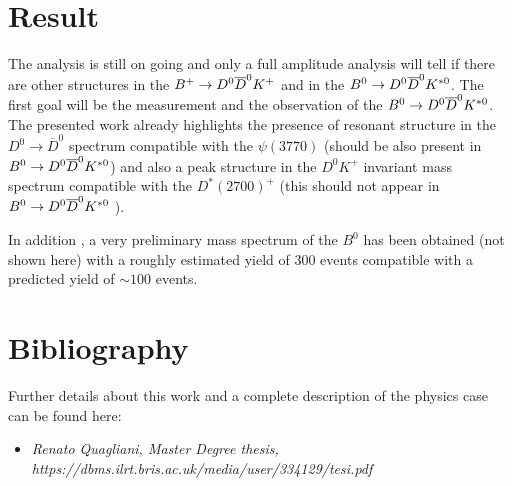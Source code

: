 \documentclass[11pt]{article}
\begin{document}
\section{Result}
The analysis is still on going and only a full amplitude analysis will tell if there are other structures in the $B^{+} \rightarrow D^0 \overline{D}^{0} K^{+}$ and in the $B^{0} \rightarrow D^0 \overline{D}^{0} K^{\ast 0}$. The first goal will be the measurement and the observation of the $B^{0} \rightarrow D^0 \overline{D}^{0} K^{\ast 0}$. The presented work already highlights the presence of resonant structure in the $D^{0} \rightarrow \overline{D} ^{0} $ spectrum compatible with the $\psi (3770)$ (should be also present in $B^{0} \rightarrow D^0 \overline{D}^{0} K^{\ast 0}$) and also a peak structure in the $D^{0} K^{+} $ invariant mass spectrum compatible with the $D^{*}(2700)^{+}$ (this should not appear in $B^{0} \rightarrow D^0 \overline{D}^{0} K^{\ast 0}$ ).

In addition , a very preliminary mass spectrum of the $B^{0}$ has been obtained (not shown here) with a roughly estimated yield of 300 events compatible with a predicted yield of $\sim 100 $ events.

\section{Bibliography}
Further details about this work and a complete description of the physics case can be found here:
\begin{itemize}
\item \textit{Renato Quagliani, Master Degree thesis, https://dbms.ilrt.bris.ac.uk/media/user/334129/tesi.pdf}
\end{itemize}
\end{document}
